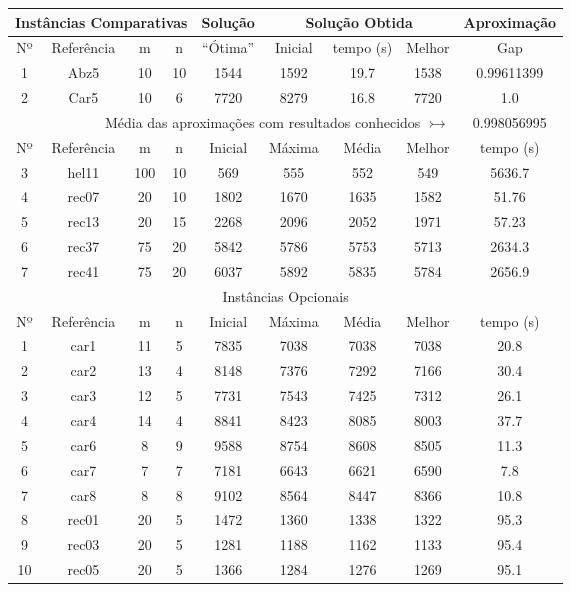 \documentclass{article}
\begin{document}
	\begin{table}
	\centering
	\begin{tabular}{c|c|c|c||c||c|c|c||c}
	\hline\hline
	\multicolumn{4}{c||}{Instâncias Comparativas} & Solução 
	& \multicolumn{3}{|c||}{Solução Obtida} & Aproximação\\
	\hline
	Nº &  Referência & m & n & ``Ótima'' & Inicial & tempo (s) & Melhor & Gap\\
	\hline\hline
	1 & Abz5 & 10 & 10 & 1544 & 1592 & 19.7 & 1538 & 0.99611399\\
	2 & Car5 & 10 & 6 & 7720 & 8279 & 16.8 & 7720 & 1.0\\
	\hline\hline
	\multicolumn{8}{r||}{Média das aproximações com resultados conhecidos
	$\rightarrowtail$} & 0.998056995	\\
	\hline\hline
	Nº &  Referência & m & n & Inicial & Máxima & Média & Melhor & tempo (s)\\
	\hline\hline
	3 & hel11 & 100 & 10 & 569 & 555 & 552 & 549 & 5636.7 \\
	4 & rec07 & 20 & 10 & 1802 & 1670 & 1635 & 1582 & 51.76 \\
	5 & rec13 & 20 & 15 & 2268 & 2096 & 2052 & 1971 & 57.23 \\
	6 & rec37 & 75 & 20 & 5842 & 5786 & 5753 & 5713 & 2634.3 \\	
	7 & rec41 & 75 & 20 & 6037 & 5892 & 5835 & 5784 & 2656.9 \\
	\hline\hline
	\multicolumn{9}{c}{Instâncias Opcionais} \\
	\hline\hline
	Nº &  Referência & m & n & Inicial & Máxima & Média & Melhor & tempo (s)\\
	\hline\hline
	1 & car1 & 11 & 5 & 7835 & 7038 & 7038 & 7038 & 20.8 \\
	2 & car2 & 13 & 4 & 8148 & 7376 & 7292 & 7166 & 30.4 \\
	3 & car3 & 12 & 5 & 7731 & 7543 & 7425 & 7312 & 26.1 \\
	4 & car4 & 14 & 4 & 8841 & 8423 & 8085 & 8003 & 37.7 \\
	5 & car6 & 8 & 9 & 9588 & 8754 & 8608 & 8505 & 11.3 \\
	6 & car7 & 7 & 7 & 7181 & 6643 & 6621 & 6590 & 7.8 \\
	7 & car8 & 8 & 8 & 9102 & 8564 & 8447 & 8366 & 10.8 \\
	8 & rec01 & 20 & 5 & 1472 & 1360 & 1338 & 1322 & 95.3 \\
	9 & rec03 & 20 & 5 & 1281 & 1188 & 1162 & 1133 & 95.4 \\
	10 & rec05 & 20 & 5 & 1366 & 1284 & 1276 & 1269 & 95.1 \\
	\hline\hline
	\end{tabular}
	\end{table}
	
\end{document}
